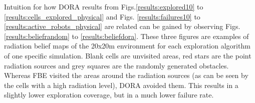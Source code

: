 
Intuition for how \ac{DORA} results from Figs.\ref{results:explored10} to \ref{results:cells_explored_physical} and Figs. \ref{results:failures10} to \ref{results:active_robots_physical} are related can be gained by observing Figs. \ref{results:beliefrandom} to \ref{results:beliefdora}. These three figures are examples of radiation belief maps of the 20x20m environment for each exploration algorithm of one specific simulation. Blank cells are unvisited areas, red stars are the point radiation sources and grey squares are the randomly generated obstacles. Whereas \ac{FBE} visited the areas around the radiation sources (as can be seen by the cells with a high radiation level), \ac{DORA} avoided them. This results in a slightly lower exploration coverage, but in a much lower failure rate.


